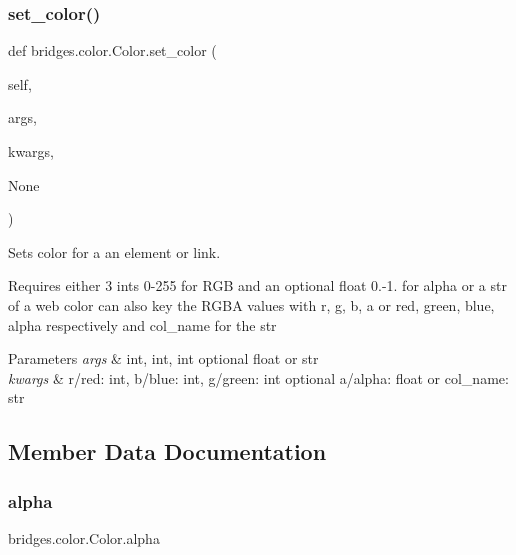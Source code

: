 \subsubsection{\texorpdfstring{set\+\_\+color()}{set\_color()}}
{\footnotesize\ttfamily def bridges.\+color.\+Color.\+set\+\_\+color (\begin{DoxyParamCaption}\item[{}]{self,  }\item[{}]{args,  }\item[{}]{kwargs,  }\item[{}]{None }\end{DoxyParamCaption})}



Sets color for a an element or link. 

Requires either 3 ints 0-\/255 for R\+GB and an optional float 0.-\/1. for alpha or a str of a web color can also key the R\+G\+BA values with r, g, b, a or red, green, blue, alpha respectively and col\+\_\+name for the str


\begin{DoxyParams}{Parameters}
{\em args} & int, int, int optional float or str \\
\hline
{\em kwargs} & r/red\+: int, b/blue\+: int, g/green\+: int optional a/alpha\+: float or col\+\_\+name\+: str \\
\hline
\end{DoxyParams}


\subsection{Member Data Documentation}
\mbox{\label{classbridges_1_1color_1_1_color_a2e170f068eeb77ace0427d23b36f2b27}} 
\subsubsection{\texorpdfstring{alpha}{alpha}}
{\footnotesize\ttfamily bridges.\+color.\+Color.\+alpha}

\mbox{\label{classbridges_1_1color_1_1_color_a2c5081c47a43419bb1c5dbbd9c72a21e}} 
